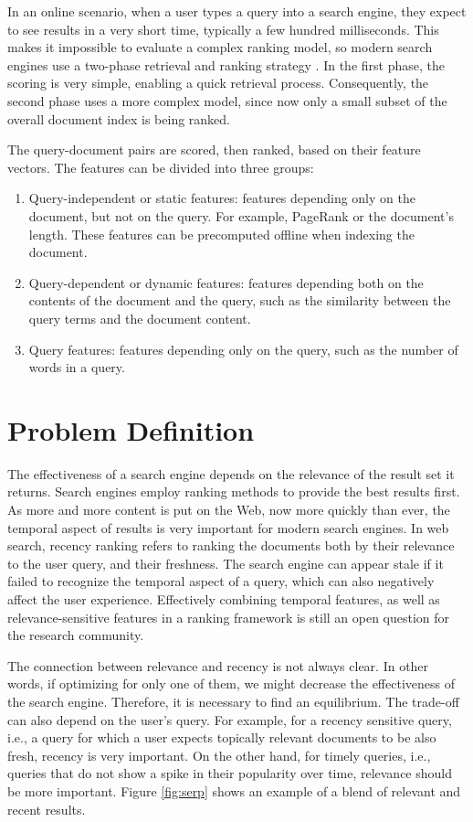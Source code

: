 In an online scenario, when a user types a query into a search engine, they expect to see results in a very short time, typically a few hundred milliseconds. This makes it impossible to evaluate a complex ranking model, so modern search engines use a two-phase retrieval and ranking strategy \citep{cambazoglu2010early}. In the first phase, the scoring is very simple, enabling a quick retrieval process. Consequently, the second phase uses a more complex model, since now only a small subset of the overall document index is being ranked.

The query-document pairs are scored, then ranked, based on their feature vectors. The features can be divided into three groups:
\begin{enumerate}
	\item Query-independent or static features: features depending only on the document, but not on the query. For example, PageRank \citep{page1999pagerank} or the document's length. These features can be precomputed offline when indexing the document.
	\item Query-dependent or dynamic features: features depending both on the contents of the document and the query, such as the similarity between the query terms and the document content.
    \item Query features: features depending only on the query, such as the number of words in a query.
\end{enumerate}

\section{Problem Definition}
The effectiveness of a search engine depends on the relevance of the result set it returns. Search engines employ ranking methods to provide the best results first. As more and more content is put on the Web, now more quickly than ever, the temporal aspect of results is very important for modern search engines. In web search, recency ranking refers to ranking the documents both by their relevance to the user query, and their freshness. The search engine can appear stale if it failed to recognize the temporal aspect of a query, which can also negatively affect the user experience. Effectively combining temporal features, as well as relevance-sensitive features in a ranking framework is still an open question for the research community.

The connection between relevance and recency is not always clear. In other words, if optimizing for only one of them, we might decrease the effectiveness of the search engine. Therefore, it is necessary to find an equilibrium. The trade-off can also depend on the user's query. For example, for a recency sensitive query, i.e., a query for which a user expects topically relevant documents to be also fresh, recency is very important. On the other hand, for timely queries, i.e., queries that do not show a spike in their popularity over time, relevance should be more important. Figure \ref{fig:serp} shows an example of a blend of relevant and recent results.

